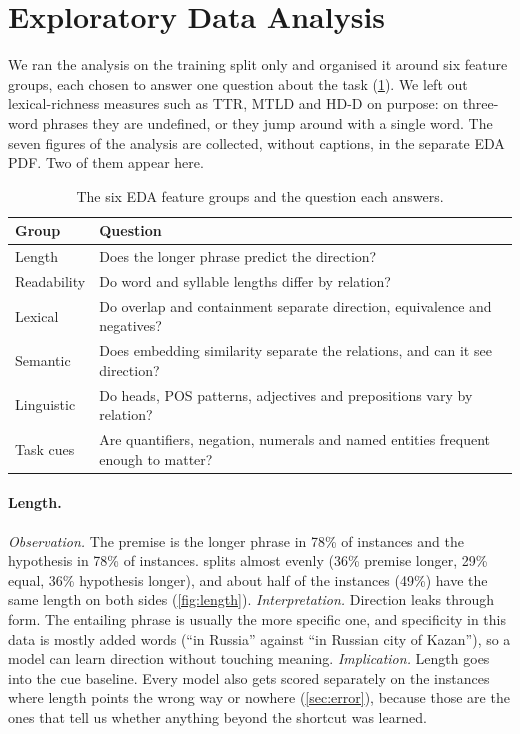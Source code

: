 \section{Exploratory Data Analysis}
\label{sec:eda}

We ran the analysis on the training split only and organised it around six feature groups, each chosen to answer one question about the task (\cref{tab:eda-groups}). We left out lexical-richness measures such as TTR, MTLD and HD-D on purpose: on three-word phrases they are undefined, or they jump around with a single word. The seven figures of the analysis are collected, without captions, in the separate EDA PDF. Two of them appear here.

\begin{table}[t]
\centering
\small
\begin{tabular}{@{}p{}p{}@{}}
\toprule
Group & Question \\
\midrule
Length & Does the longer phrase predict the direction? \\
Readability & Do word and syllable lengths differ by relation? \\
Lexical & Do overlap and containment separate direction, equivalence and negatives? \\
Semantic & Does embedding similarity separate the relations, and can it see direction? \\
Linguistic & Do heads, POS patterns, adjectives and prepositions vary by relation? \\
Task cues & Are quantifiers, negation, numerals and named entities frequent enough to matter? \\
\bottomrule
\end{tabular}
\caption{The six EDA feature groups and the question each answers.}
\label{tab:eda-groups}
\end{table}

\paragraph{Length.}
\textit{Observation.} The premise is the longer phrase in 78\% of \FW{} instances and the hypothesis in 78\% of \BW{} instances. \EQ{} splits almost evenly (36\% premise longer, 29\% equal, 36\% hypothesis longer), and about half of the \NO{} instances (49\%) have the same length on both sides (\cref{fig:length}). \textit{Interpretation.} Direction leaks through form. The entailing phrase is usually the more specific one, and specificity in this data is mostly added words (``in Russia'' against ``in Russian city of Kazan''), so a model can learn direction without touching meaning. \textit{Implication.} Length goes into the cue baseline. Every model also gets scored separately on the instances where length points the wrong way or nowhere (\cref{sec:error}), because those are the ones that tell us whether anything beyond the shortcut was learned.

